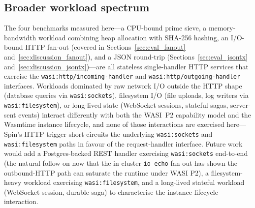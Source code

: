 \subsection{Broader workload spectrum}
\label{sec:future_work_workloads}

\begin{sloppypar}
The four benchmarks measured here---a \acs{CPU}-bound prime sieve, a memory-bandwidth workload combining heap allocation with SHA-256 hashing, an I/O-bound HTTP fan-out (covered in Sections~\ref{sec:eval_fanout} and~\ref{sec:discussion_fanout}), and a JSON round-trip (Sections~\ref{sec:eval_jsontx} and~\ref{sec:discussion_jsontx})---are all stateless single-handler \acs{HTTP} services that exercise the \texttt{wasi:http/incoming-handler} and \texttt{wasi:http/outgoing-handler} interfaces. Workloads dominated by raw network I/O outside the HTTP shape (database queries via \texttt{wasi:sockets}), filesystem I/O (file uploads, log writers via \texttt{wasi:filesystem}), or long-lived state (WebSocket sessions, stateful sagas, server-sent events) interact differently with both the \acs{WASI}~P2 capability model and the Wasmtime instance lifecycle, and none of those interactions are exercised here---Spin's \acs{HTTP} trigger short-circuits the underlying \texttt{wasi:sockets} and \texttt{wasi:filesystem} paths in favour of the request-handler interface. Future work would add a Postgres-backed REST handler exercising \texttt{wasi:sockets} end-to-end (the natural follow-on now that the in-cluster \texttt{io-echo} fan-out has shown the outbound-\acs{HTTP} path can saturate the runtime under WASI P2), a filesystem-heavy workload exercising \texttt{wasi:filesystem}, and a long-lived stateful workload (WebSocket session, durable saga) to characterise the instance-lifecycle interaction.
\end{sloppypar}
